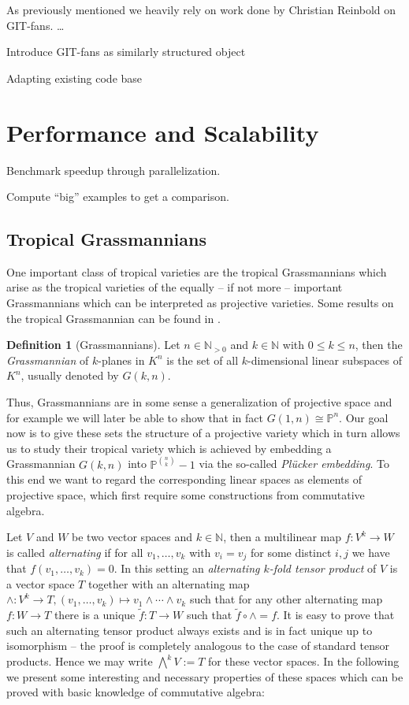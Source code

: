 \documentclass[
  paper=a4,
  DIV=14,
  fontsize=12pt,
  titlepage,
  bibliography=totoc,
  listof=totoc,
  pagesize=pdftex
]{scrartcl}
\numberwithin{figure}{section}
\numberwithin{equation}{section}
\numberwithin{table}{section}
\newcommand*\setN{\mathds{N}}
\newcommand*\setP{\mathds{P}}
\theoremstyle{definition}
\newtheorem{definition}{Definition}
\numberwithin{definition}{section}
\begin{document}
As previously mentioned we heavily rely on work done by Christian Reinbold on GIT-fans.
\dots

Introduce GIT-fans as similarly structured object

Adapting existing code base

\section{Performance and Scalability}

Benchmark speedup through parallelization.

Compute \enquote{big} examples to get a comparison.

\subsection{Tropical Grassmannians}

One important class of tropical varieties are the tropical Grassmannians which arise as
the tropical varieties of the equally -- if not more -- important Grassmannians which can
be interpreted as projective varieties. Some results on the tropical Grassmannian can be
found in \cite{tropGrass}.

\begin{definition}[Grassmannians]
  Let $n \in \setN_{>0}$ and $k \in \setN$ with $0 \leq k \leq n$, then the
  \emph{Grassmannian} of $k$-planes in $K^n$ is the set of all $k$-dimensional linear
  subspaces of $K^n$, usually denoted by $G(k, n)$.
\end{definition}

Thus, Grassmannians are in some sense a generalization of projective space and for example
we will later be able to show that in fact $G(1,n) \cong \setP^n$. Our goal now is to
give these sets the structure of a projective variety which in turn allows us to study their
tropical variety which is achieved by embedding a Grassmannian $G(k, n)$ into $\setP^{\binom
nk}-1$ via the so-called \emph{Plücker embedding}. To this end we want to regard the
corresponding linear spaces as elements of projective space, which first require some
constructions from commutative algebra.

Let $V$ and $W$ be two vector spaces and $k\in\setN$, then a multilinear map $f : V^k \to
W$ is called \emph{alternating} if for all $v_1, \dots, v_k$ with $v_i=v_j$ for some
distinct $i,j$ we have that $f(v_1, \dots, v_k) = 0$. In this setting an \emph{alternating
$k$-fold tensor product} of $V$ is a vector space $T$ together with an alternating map
$\wedge:V^k\to T, (v_1, \dots, v_k) \mapsto v_1\wedge\cdots\wedge v_k$ such that for any
other alternating map $f:W\to T$ there is a unique $\tilde f:T\to W$ such that $\tilde f
\circ \wedge = f$. It is easy to prove that such an alternating tensor product always
exists and is in fact unique up to isomorphism -- the proof is completely analogous to the
case of standard tensor products. Hence we may write $\bigwedge^k V := T$ for these vector
spaces. In the following we present some interesting and necessary properties of these
spaces which can be proved with basic knowledge of commutative algebra:
\end{document}
